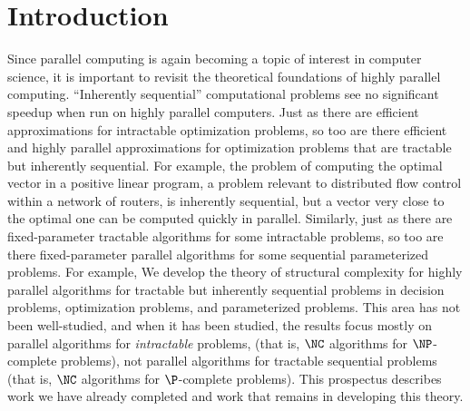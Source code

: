 \chapter{Introduction}

%
Since parallel computing is again becoming a topic of interest in computer science, it is important to revisit the theoretical foundations of highly parallel computing.
``Inherently sequential'' computational problems see no significant speedup when run on highly parallel computers.
Just as there are efficient approximations for intractable optimization problems, so too are there efficient and highly parallel approximations for optimization problems that are tractable but inherently sequential.
For example, the problem of computing the optimal vector in a positive linear program, a problem relevant to distributed flow control within a network of routers, is inherently sequential, but a vector very close to the optimal one can be computed quickly in parallel.
Similarly, just as there are fixed-parameter tractable algorithms for some intractable problems, so too are there fixed-parameter parallel algorithms for some sequential parameterized problems.
For example, 
We develop the theory of structural complexity for highly parallel algorithms for tractable but inherently sequential problems in decision problems, optimization problems, and parameterized problems.
This area has not been well-studied, and when it has been studied, the results focus mostly on parallel algorithms for \emph{intractable} problems, (that is, $\NC$ algorithms for $\NP$-complete problems), not parallel algorithms for tractable sequential problems (that is, $\NC$ algorithms for $\P$-complete problems).
This prospectus describes work we have already completed and work that remains in developing this theory.

